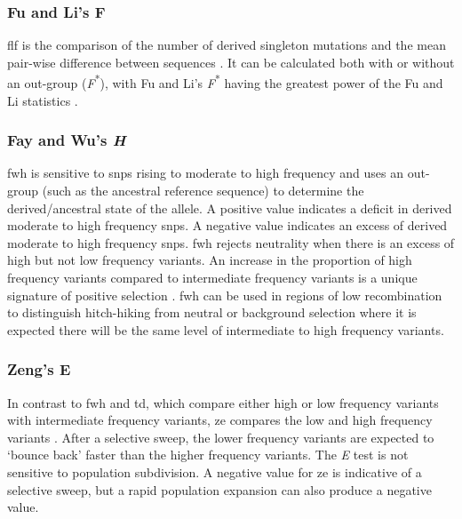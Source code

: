\documentclass[]{report}
\begin{document}
\subsubsection{Fu and Li's F}\label{fu-and-lis-f}

\gls{flf} is the comparison of the number of derived singleton mutations
and the mean pair-wise difference between sequences \citep{Fu1993}. It
can be calculated both with or without an out-group
(\emph{F}\textsuperscript{*}), with Fu and Li's
\emph{F}\textsuperscript{*} having the greatest power of the Fu and Li
statistics \citep{Fu1993, Ramirez-Soriano2008}.

\subsubsection{\texorpdfstring{Fay and Wu's
\emph{H}}{Fay and Wu's H}}\label{fay-and-wus-h}

\gls{fwh} is sensitive to \glspl{snp} rising to moderate to high
frequency and uses an out-group (such as the ancestral reference
sequence) to determine the derived/ancestral state of the allele. A
positive value indicates a deficit in derived moderate to high frequency
\glspl{snp}. A negative value indicates an excess of derived moderate to
high frequency \glspl{snp}. \Gls{fwh} rejects neutrality when there is
an excess of high but not low frequency variants. An increase in the
proportion of high frequency variants compared to intermediate frequency
variants is a unique signature of positive selection
\citep{fay2000hitchhiking}. \Gls{fwh} can be used in regions of low
recombination to distinguish hitch-hiking from neutral or background
selection where it is expected there will be the same level of
intermediate to high frequency variants.

\subsubsection{Zeng's E}\label{zengs-e}

In contrast to \gls{fwh} and \gls{td}, which compare either high or low
frequency variants with intermediate frequency variants, \gls{ze}
compares the low and high frequency variants \citep{Zeng2006}. After a
selective sweep, the lower frequency variants are expected to `bounce
back' faster than the higher frequency variants. The \emph{E} test is
not sensitive to population subdivision. A negative value for \gls{ze}
is indicative of a selective sweep, but a rapid population expansion can
also produce a negative value.
\end{document}
